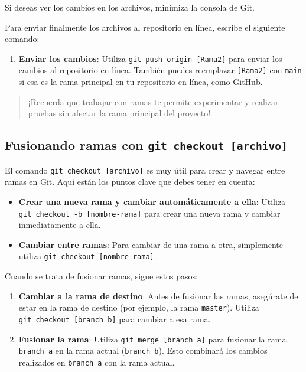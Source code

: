 \documentclass[
  letterpaper,
  DIV=11,
  numbers=noendperiod]{scrartcl}
\providecommand{\tightlist}{%
  \setlength{\itemsep}{0pt}\setlength{\parskip}{0pt}}\usepackage{longtable,booktabs,array}
\begin{document}
Si deseas ver los cambios en los archivos, minimiza la consola de Git.

Para enviar finalmente los archivos al repositorio en línea, escribe el
siguiente comando:

\begin{enumerate}
\def\labelenumi{\arabic{enumi}.}
\tightlist
\item
  \textbf{Enviar los cambios}: Utiliza
  \texttt{git\ push\ origin\ {[}Rama2{]}} para enviar los cambios al
  repositorio en línea. También puedes reemplazar \texttt{{[}Rama2{]}}
  con \texttt{main} si esa es la rama principal en tu repositorio en
  línea, como GitHub.
\end{enumerate}

\begin{quote}
¡Recuerda que trabajar con ramas te permite experimentar y realizar
pruebas sin afectar la rama principal del proyecto!
\end{quote}

\hypertarget{fusionando-ramas-con-git-checkout-archivo}{%
\subsection{\texorpdfstring{Fusionando ramas con
\texttt{git\ checkout\ {[}archivo{]}}}{Fusionando ramas con git checkout {[}archivo{]}}}\label{fusionando-ramas-con-git-checkout-archivo}}

El comando \texttt{git\ checkout\ {[}archivo{]}} es muy útil para crear
y navegar entre ramas en Git. Aquí están los puntos clave que debes
tener en cuenta:

\begin{itemize}
\item
  \textbf{Crear una nueva rama y cambiar automáticamente a ella}:
  Utiliza \texttt{git\ checkout\ -b\ {[}nombre-rama{]}} para crear una
  nueva rama y cambiar inmediatamente a ella.
\item
  \textbf{Cambiar entre ramas}: Para cambiar de una rama a otra,
  simplemente utiliza \texttt{git\ checkout\ {[}nombre-rama{]}}.
\end{itemize}

Cuando se trata de fusionar ramas, sigue estos pasos:

\begin{enumerate}
\def\labelenumi{\arabic{enumi}.}
\item
  \textbf{Cambiar a la rama de destino}: Antes de fusionar las ramas,
  asegúrate de estar en la rama de destino (por ejemplo, la rama
  \texttt{master}). Utiliza \texttt{git\ checkout\ {[}branch\_b{]}} para
  cambiar a esa rama.
\item
  \textbf{Fusionar la rama}: Utiliza
  \texttt{git\ merge\ {[}branch\_a{]}} para fusionar la rama
  \texttt{branch\_a} en la rama actual (\texttt{branch\_b}). Esto
  combinará los cambios realizados en \texttt{branch\_a} con la rama
  actual.
\end{enumerate}
\end{document}
